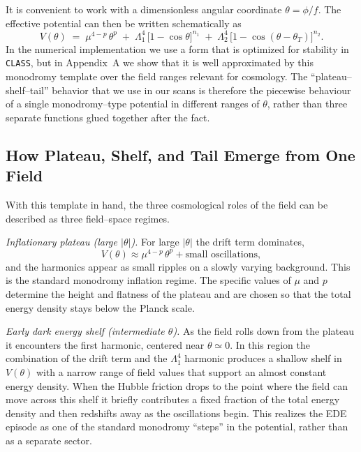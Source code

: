 \documentclass[a4paper,11pt]{article}
\begin{document}
It is convenient to work with a dimensionless angular coordinate $\theta = \phi/f$. The effective potential can then be written schematically as
\begin{equation}
    V(\theta) \;=\; \mu^{4-p}\,\theta^{p}
    \;+\; \Lambda_1^4\,\Big[1 - \cos\theta\Big]^{n_1}
    \;+\; \Lambda_2^4\,\Big[1 - \cos(\theta - \theta_T)\Big]^{n_2}.
    \label{eq:unified_potential}
\end{equation}
In the numerical implementation we use a form that is optimized for stability in \texttt{CLASS}, but in Appendix~A we show that it is well approximated by this monodromy template over the field ranges relevant for cosmology. The ``plateau–shelf–tail'' behavior that we use in our scans is therefore the piecewise behaviour of a single monodromy–type potential in different ranges of $\theta$, rather than three separate functions glued together after the fact.


\subsection{How Plateau, Shelf, and Tail Emerge from One Field}

With this template in hand, the three cosmological roles of the field can be described as three field–space regimes.

\textit{Inflationary plateau (large $|\theta|$).} For large $|\theta|$ the drift term dominates,
\begin{equation}
    V(\theta) \approx \mu^{4-p}\,\theta^{p} + \text{small oscillations},
\end{equation}
and the harmonics appear as small ripples on a slowly varying background. This is the standard monodromy inflation regime. The specific values of $\mu$ and $p$ determine the height and flatness of the plateau and are chosen so that the total energy density stays below the Planck scale.

\textit{Early dark energy shelf (intermediate $\theta$).} As the field rolls down from the plateau it encounters the first harmonic, centered near $\theta \simeq 0$. In this region the combination of the drift term and the $\Lambda_1^4$ harmonic produces a shallow shelf in $V(\theta)$ with a narrow range of field values that support an almost constant energy density. When the Hubble friction drops to the point where the field can move across this shelf it briefly contributes a fixed fraction of the total energy density and then redshifts away as the oscillations begin. This realizes the EDE episode as one of the standard monodromy ``steps'' in the potential, rather than as a separate sector.
\end{document}
